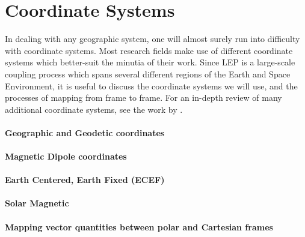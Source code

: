 \section{Coordinate Systems}
In dealing with any geographic system, one will almost surely run into difficulty with coordinate systems. Most research fields make use of different coordinate systems which better-suit the minutia of their work. Since LEP is a large-scale coupling process which spans several different regions of the Earth and Space Environment, it is useful to discuss the coordinate systems we will use, and the processes of mapping from frame to frame. For an in-depth review of many additional coordinate systems, see the work by \cite{Laundal2016}.

\paragraph{Geographic and Geodetic coordinates}

\paragraph{Magnetic Dipole coordinates}

\paragraph{Earth Centered, Earth Fixed (ECEF)} 

\paragraph{Solar Magnetic}

\paragraph{Mapping vector quantities between polar and Cartesian frames}

